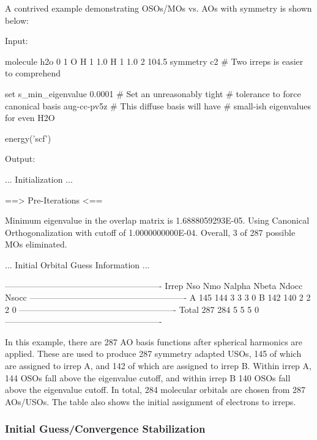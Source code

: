 A contrived example demonstrating OSOs/MOs vs. AOs with symmetry is shown below:
\begin{Snippet}
Input:

molecule h2o {
0 1
O
H 1 1.0
H 1 1.0 2 104.5
symmetry c2 # Two irreps is easier to comprehend
}

set {
s_min_eigenvalue 0.0001 # Set an unreasonably tight 
                        # tolerance to force canonical
basis aug-cc-pv5z       # This diffuse basis will have 
                        # small-ish eigenvalues for even H2O
}

energy('scf')

Output:

  ... Initialization ...

  ==> Pre-Iterations <==

  Minimum eigenvalue in the overlap matrix is 1.6888059293E-05.
  Using Canonical Orthogonalization with cutoff of 1.0000000000E-04.
  Overall, 3 of 287 possible MOs eliminated. 

  ... Initial Orbital Guess Information ...

   -------------------------------------------------------
    Irrep   Nso     Nmo     Nalpha   Nbeta   Ndocc  Nsocc
   -------------------------------------------------------
     A        145     144       3       3       3       0
     B        142     140       2       2       2       0
   -------------------------------------------------------
    Total     287     284       5       5       5       0
   -------------------------------------------------------

\end{Snippet}   
In this example, there are 287 AO basis functions after spherical harmonics are
applied. These are used to produce 287 symmetry adapted USOs, 145 of which are
assigned to irrep A, and 142 of which are assigned to irrep B. Within irrep A,
144 OSOs fall above the eigenvalue cutoff, and within irrep B 140 OSOs fall
above the eigenvalue cutoff. In total, 284 molecular orbitals are chosen from
287 AOs/USOs. The table also shows the initial assignment of electrons to
irreps.  

\subsubsection{Initial Guess/Convergence Stabilization}

